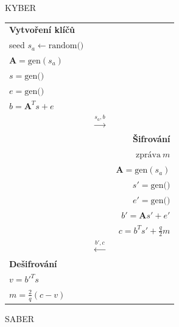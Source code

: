 \begin{figure}[ht]
    \centering
    \begin{minipage}[t]{0.5\textwidth}
        \centering
        \caption*{KYBER}

        \begin{tabular}{lcr}
        \textbf{Vytvoření klíčů} && \\
        seed $s_a \leftarrow \text{random()}$ && \\
        $\textbf{A} = \text{gen}(s_a)$ && \\
        $s = \text{gen()}$ && \\
        $e = \text{gen()}$ && \\
        $b = \textbf{A}^T s + e$ && \\
        & $\stackrel{s_a, b}{\longrightarrow}$ & \\
        && \textbf{Šifrování} \\
        && $\text{zpráva}\ m$ \\
        && $\textbf{A} = \text{gen}(s_a)$ \\
        && $s' = \text{gen()}$ \\
        && $e' = \text{gen()}$ \\
        && $b' = \textbf{A}s' + e'$ \\
        && $c = b^Ts' + \frac{q}{2}m$ \\
        & $\stackrel{b', c}{\longleftarrow}$ & \\
        \textbf{Dešifrování} && \\
        $v = b'^T s$ && \\
        $m = \frac{2}{q}(c - v)$ && \\
        \end{tabular}
    \end{minipage}\hfill\begin{minipage}[t]{0.5\textwidth}
        \centering
        \caption*{SABER}


\end{minipage}
\end{figure}
